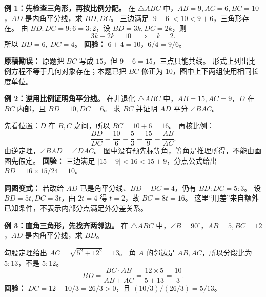 \clearpage
\begin{examplebox}
\textbf{例 1：先检查三角形，再按比例分配。}
在 $\triangle ABC$ 中，$AB=9,AC=6,BC=10$，$AD$ 是内角平分线，求 $BD,DC$。
三边满足 $|9-6|<10<9+6$，三角形存在。
由 $BD:DC=9:6=3:2$，设 $BD=3k,DC=2k$，则
\[
 3k+2k=10\quad\Longrightarrow\quad k=2.
\]
所以 $\boxed{BD=6,\ DC=4}$。
\textbf{回验：} $6+4=10$，$6/4=9/6$。

\textbf{原稿勘误：} 原题把 $BC$ 写成 $15$，但 $9+6=15$，三点只能共线。
形式上列出比例方程不等于几何对象存在；本题已把 $BC$ 修正为 $10$，图中上下两组使用相同长度单位。

\tcbbreak
\textbf{例 2：逆用比例证明角平分线。}
在非退化 $\triangle ABC$ 中，$AB=15,AC=9$，$D$ 在 $BC$ 内部，且 $BD=10,DC=6$。
求 $BC$ 并证明 $AD$ 平分 $\angle BAC$。

先看位置：$D$ 在 $B,C$ 之间，所以 $BC=10+6=\boxed{16}$。
再核比例：
\[
 \frac{BD}{DC}=\frac{10}{6}=\frac53=\frac{15}{9}=\frac{AB}{AC}.
\]
由逆定理，$\boxed{\angle BAD=\angle DAC}$。
图中没有预先标等角，等角是推理所得，不能由画图先假定。
\textbf{回验：} 三边满足 $|15-9|<16<15+9$，分点公式给出 $BD=16\times15/24=10$。

\textbf{同图变式：} 若改给 $AD$ 已是角平分线、$BD-DC=4$，仍有 $BD:DC=5:3$。
设 $BD=5t,DC=3t$，由 $2t=4$ 得 $t=2$，故 $BC=8t=16$。
这里“用差”来自额外已知条件，不表示内部分点满足外分差关系。

\tcbbreak
\textbf{例 3：直角三角形，先找齐两邻边。}
在 $\triangle ABC$ 中，$\angle B=90^\circ$，$AB=5,BC=12$，$AD$ 是内角平分线，求 $BD$。

勾股定理给出 $AC=\sqrt{5^2+12^2}=13$。
角 $A$ 的邻边是 $AB,AC$，所以分段比为 $5:13$，不是 $5:12$。
\[
 BD=\frac{BC\cdot AB}{AB+AC}
    =\frac{12\times5}{5+13}
    =\boxed{\frac{10}{3}}.
\]
\textbf{回验：} $DC=12-10/3=26/3>0$，且 $(10/3)/(26/3)=5/13$。
\end{examplebox}
